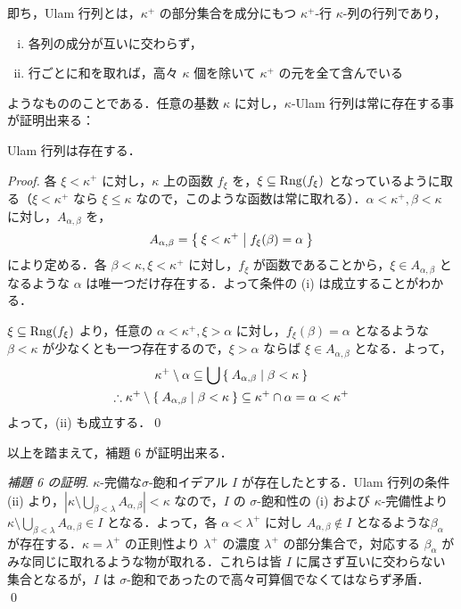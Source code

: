 \documentclass[a4j]{jsarticle}
\begin{document}
即ち，Ulam 行列とは，$\kappa^+$ の部分集合を成分にもつ $\kappa^+$-行 $\kappa$-列の行列であり，
\begin{enumerate}[(i)]
 \item 各列の成分が互いに交わらず，
 \item 行ごとに和を取れば，高々 $\kappa$ 個を除いて $\kappa^+$ の元を全て含んでいる
\end{enumerate}
ようなもののことである．任意の基数 $\kappa$ に対し，$\kappa$-Ulam 行列は常に存在する事が証明出来る：
\begin{lemma}\label{lem:Ulam-matrix-exists}
 Ulam 行列は存在する．
\end{lemma}
\begin{proof}
 各 $\xi < \kappa^+$ に対し，$\kappa$ 上の函数 $f_\xi$ を，$\xi \subseteq \mathrm{Rng}(f_\xi)$ となっているように取る（$\xi < \kappa^+$ なら $\xi \leq \kappa$ なので，このような函数は常に取れる）．$\alpha < \kappa^+, \beta < \kappa$ に対し，$A_{\alpha, \beta}$ を，
 \[
  A_{\alpha, \beta} = \Set{\xi < \kappa^+ | f_\xi(\beta) = \alpha }
 \]
 により定める．各 $\beta < \kappa, \xi < \kappa^+$ に対し，$f_\xi$ が函数であることから，$\xi \in A_{\alpha, \beta}$ となるような $\alpha$ は唯一つだけ存在する．よって条件の (i) は成立することがわかる．

 $\xi \subseteq \mathrm{Rng}(f_\xi)$ より，任意の $\alpha < \kappa^+, \xi > \alpha$ に対し，$f_\xi(\beta) = \alpha$ となるような $\beta < \kappa$ が少なくとも一つ存在するので，$\xi > \alpha$ ならば $\xi \in A_{\alpha, \beta}$ となる．よって，
 \begin{gather*}
  \kappa^+ \setminus \alpha \subseteq \bigcup\Set{ A_{\alpha, \beta} | \beta < \kappa}\\
  \therefore \kappa^+ \setminus \Set{ A_{\alpha, \beta} | \beta < \kappa}
  \subseteq \kappa^+ \cap \alpha = \alpha < \kappa^+
 \end{gather*}
 よって，(ii) も成立する．\qed
\end{proof}

以上を踏まえて，補題 $6$ が証明出来る．
\begin{proof}[補題 6 の証明]
 $\kappa$-完備な$\sigma$-飽和イデアル $I$ が存在したとする．Ulam 行列の条件 (ii) より，$|\kappa \setminus \bigcup_{\beta < \lambda} A_{\alpha, \beta}| < \kappa$ なので，$I$ の $\sigma$-飽和性の (i) および $\kappa$-完備性より $\kappa \setminus \bigcup_{\beta < \lambda} A_{\alpha, \beta} \in I$ となる．よって，各 $\alpha < \lambda^+$ に対し $A_{\alpha, \beta} \notin I$ となるような$\beta_\alpha$ が存在する．$\kappa = \lambda^+$ の正則性より $\lambda^+$ の濃度 $\lambda^+$ の部分集合で，対応する $\beta_\alpha$ がみな同じに取れるような物が取れる．これらは皆 $I$ に属さず互いに交わらない集合となるが，$I$ は $\sigma$-飽和であったので高々可算個でなくてはならず矛盾． \qed
\end{proof}
\end{document}
